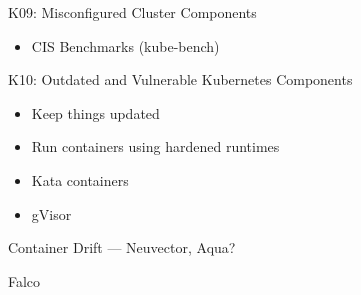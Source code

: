 \documentclass{dcpresentation}
\begin{document}
\begin{frame}{K09: Misconfigured Cluster Components}
 \begin{itemize}
  \item CIS Benchmarks (kube-bench)
 \end{itemize}
\end{frame}


\begin{frame}{K10: Outdated and Vulnerable Kubernetes Components}
 \begin{itemize}
  \item Keep things updated
 \end{itemize}
\end{frame}



\begin{frame}
 \begin{itemize}
  \item Run containers using hardened runtimes
  \item Kata containers
  \item gVisor
 \end{itemize}
\end{frame}
 
 
 \begin{frame}
 Container Drift --- Neuvector, Aqua?
 \end{frame}

 Falco
 
\end{document}

